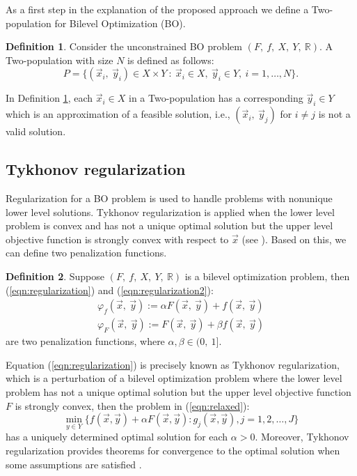 \documentclass[conference]{IEEEtran}
\theoremstyle{definition}
\newtheorem{definition}{Definition}[section]
\begin{document}
As a first step in the explanation of the proposed approach we define a
Two-population for Bilevel Optimization (BO).

\begin{definition}
    \label{def:pop2}
    Consider the unconstrained BO problem $(F, \ f, \ X, \ Y, \ \mathbb{R} )$. A
    Two-population with size $N$ is defined as follows:
    $$
        P = \{  (\vec{x}_i, \ \vec{y}_i) \in X \times Y \ : \
                \vec{x}_i \in X, \ \vec{y}_i \in Y, \ i=1,\ldots,N
            \}.
    $$     
\end{definition}
 
In Definition \ref{def:pop2}, each $\vec{x}_i \in X$ in a Two-population has a
corresponding $\vec{y}_i \in Y$ which is an approximation of a feasible solution,
i.e., $(\vec{x}_i, \ \vec{y}_j)$ for $i \neq j$ is  not a valid solution.

\subsection{Tykhonov regularization}
Regularization for a BO problem is used to handle problems with nonunique lower
level solutions.  Tykhonov regularization is applied when the lower level problem
is convex and has not a unique optimal solution but the upper level objective function
is strongly convex with respect to $\vec{x}$ (see \cite{dempe2002foundations}).
Based on this, we can define two penalization functions.

\begin{definition}
    Suppose $(F, \ f, \ X, \ Y, \ \mathbb{R} )$ is a bilevel optimization problem,
    then (\ref{eqn:regularization}) and (\ref{eqn:regularization2}):
    \begin{align}
        \label{eqn:regularization}
        \varphi_f (\vec{x},\ \vec{y}) := \alpha F(\vec{x},\ \vec{y}) +  f(\vec{x},\ \vec{y}) \\
        \label{eqn:regularization2}
        \varphi_F (\vec{x},\ \vec{y}) := F(\vec{x},\ \vec{y}) +  \beta f(\vec{x},\ \vec{y})
    \end{align}
    are two penalization functions, where $\alpha, \beta \in (0,\ 1]$.
\end{definition}
% 
Equation (\ref{eqn:regularization}) is precisely known as Tykhonov regularization, which is a
perturbation of a bilevel optimization problem where the lower level problem has
not a unique optimal solution but the upper level objective function $F$ is 
strongly convex, then the problem in (\ref{eqn:relaxed}):
\begin{equation}
    \min_{y \in Y} \{ f(\vec{x},\vec{y}) + \alpha F(\vec{x}, \vec{y}) : g_j(\vec{x}, \vec{y}), j=1,2,\ldots, J\} 
    \label{eqn:relaxed}
\end{equation}
% 
has a uniquely determined optimal solution for each $\alpha > 0$. 
Moreover, Tykhonov regularization provides theorems for convergence to the optimal
solution when some assumptions are satisfied \cite{dempe2002foundations}. 
\end{document}
